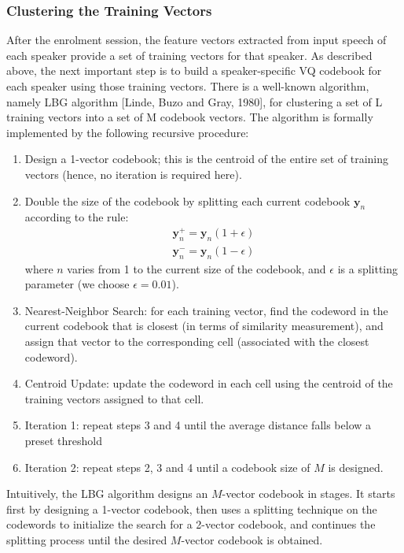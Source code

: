 \documentclass{article}
\def\y{\mathbf{y}}
\begin{document}
\subsubsection{Clustering the Training Vectors}
After the enrolment session, the feature vectors extracted from input speech of each speaker provide a set of training vectors for that speaker.  As described above, the next important step is to build a speaker-specific VQ codebook for each speaker using those training vectors.  There is a well-known algorithm, namely LBG algorithm [Linde, Buzo and Gray, 1980], for clustering a set of L training vectors into a set of M codebook vectors.  The algorithm is formally implemented by the following recursive procedure:

\begin{enumerate}
    \item Design a 1-vector codebook; this is the centroid of the entire set of training vectors (hence, no iteration is required here).
    \item Double the size of the codebook by splitting each current codebook $\y_n$ according to the rule:
    \begin{gather*}
        \y_n^+ = \y_n(1+\epsilon)\\
        \y_n^- = \y_n(1-\epsilon)
    \end{gather*}
    where $n$ varies from 1 to the current size of the codebook, and $\epsilon$ is a splitting parameter (we choose $\epsilon=0.01$).
    \item Nearest-Neighbor Search: for each training vector, find the codeword in the current codebook that is closest (in terms of similarity measurement), and assign that vector to the corresponding cell (associated with the closest codeword).
    \item Centroid Update: update the codeword in each cell using the centroid of the training vectors assigned to that cell.
    \item Iteration 1: repeat steps 3 and 4 until the average distance falls below a preset threshold
    \item Iteration 2: repeat steps 2, 3 and 4 until a codebook size of $M$ is designed.

\end{enumerate}

Intuitively, the LBG algorithm designs an $M$-vector codebook in stages.  It starts first by designing a 1-vector codebook, then uses a splitting technique on the codewords to initialize the search for a 2-vector codebook, and continues the splitting process until the desired $M$-vector codebook is obtained.
\end{document}
